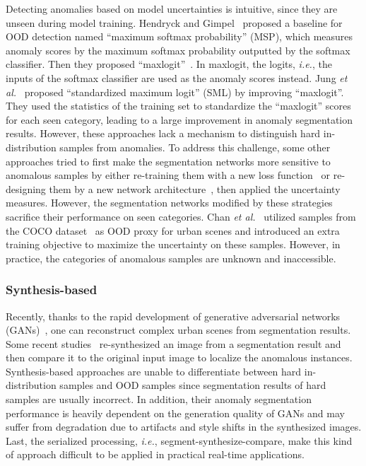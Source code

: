 \documentclass[10pt,twocolumn,letterpaper]{article}
\begin{document}
Detecting anomalies based on model uncertainties is intuitive, since they are unseen during model training. Hendryck and Gimpel~\cite{MSP} proposed a baseline for OOD detection named ``maximum softmax probability'' (MSP), which measures anomaly scores by the maximum softmax probability outputted by the softmax classifier. Then they proposed ``maxlogit''~\cite{streethazards}. In maxlogit, the logits, \emph{i.e.}, the inputs of the softmax classifier are used as the anomaly scores instead. Jung \emph{et al.}~\cite{SML} proposed ``standardized maximum logit'' (SML) by improving ``maxlogit''. They used the statistics of the training set to standardize the ``maxlogit'' scores for each seen category, leading to a large improvement in anomaly segmentation results. However, these approaches lack a mechanism to distinguish hard in-distribution samples from anomalies. To address this challenge, some other approaches tried to first make the segmentation networks more sensitive to anomalous samples by either re-training them with a new loss function~\cite{deepmetric} or re-designing them by a new network architecture~\cite{Dense}, then applied the uncertainty measures. However, the segmentation networks modified by these strategies sacrifice their performance on seen categories. Chan \emph{et al.}~\cite{EntMax} utilized samples from the COCO dataset~\cite{coco} as OOD proxy for urban scenes and introduced an extra training objective to maximize the uncertainty on these samples. However, in practice, the categories of anomalous samples are unknown and inaccessible.




\subsubsection{Synthesis-based}
Recently, thanks to the rapid development of generative adversarial networks (GANs)~\cite{GAN,GauGAN}, one can reconstruct complex urban scenes from segmentation results. Some recent studies~\cite{imgr,SynthCP,noti} re-synthesized an image from a segmentation result and then compare it to the original input image to localize the anomalous instances. Synthesis-based approaches are unable to differentiate between hard in-distribution samples and OOD samples since segmentation results of hard samples are usually incorrect. In addition, their anomaly segmentation performance is heavily dependent on the generation quality of GANs and may suffer from degradation due to artifacts and style shifts in the synthesized images. Last, the serialized processing, \emph{i.e.}, segment-synthesize-compare, make this kind of approach difficult to be applied in practical real-time applications.
\end{document}
